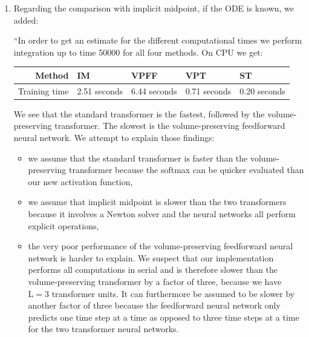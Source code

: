 \documentclass{article}
\begin{document}
\begin{enumerate}
{\begin{enumerate}
            \item Regarding the comparison with implicit midpoint, if the ODE is known, we added:

            ``In order to get an estimate for the different computational times we perform integration up to time 50000 for all four methods. On CPU we get:
            
            \begin{table}[h]
            \centering
            \begin{tabulary}{\linewidth}{R L L L L}
            \toprule
            \color{mred} Method & \color{mred} IM & \color{mred} VPFF & \color{mred} VPT & \color{mred} ST \\
            \toprule
            \color{mred} Training time & \color{mred} 2.51 seconds & \color{mred} 6.44 seconds & \color{mred} 0.71 seconds & \color{mred} 0.20 seconds \\
            \bottomrule
            \end{tabulary}
            
            \end{table}
            
            We see that the standard transformer is the fastest, followed by the volume-preserving transformer. The slowest is the volume-preserving feedforward neural network. We attempt to explain those findings:
            
            \begin{itemize}
            \item we assume that the standard transformer is faster than the volume-preserving transformer because the softmax can be quicker evaluated than our new activation function,
            \item we assume that implicit midpoint is slower than the two transformers because it involves a Newton solver and the neural networks all perform explicit operations,
            \item the very poor performance of the volume-preserving feedforward neural network is harder to explain. We suspect that our implementation performs all computations in serial and is therefore slower than the volume-preserving transformer by a factor of three, because we have \(\mathrm{L} = 3\) transformer units. It can furthermore be assumed to be slower by another factor of three because the feedforward neural network only predicts one time step at a time as opposed to three time steps at a time for the two transformer neural networks.
            \end{itemize}
            

\end{enumerate}}
\end{enumerate}
\end{document}
